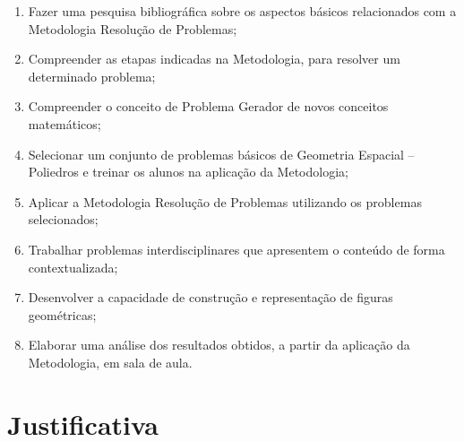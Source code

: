 \begin{enumerate}

    \item Fazer uma pesquisa bibliográfica sobre os aspectos básicos relacionados com a Metodologia Resolução de Problemas;
    \item Compreender as etapas indicadas na Metodologia, para resolver um determinado problema;
    \item Compreender o conceito de Problema Gerador de novos conceitos matemáticos;
    \item Selecionar um conjunto de problemas básicos de Geometria Espacial – Poliedros e treinar os alunos na aplicação da Metodologia;
    \item Aplicar a Metodologia Resolução de Problemas utilizando os problemas selecionados;
    \item Trabalhar problemas interdisciplinares que apresentem o conteúdo de forma contextualizada;
    \item Desenvolver a capacidade de construção e representação de figuras geométricas;
    \item Elaborar uma análise dos resultados obtidos, a partir da aplicação da Metodologia, em sala de aula.

\end{enumerate}

\section{Justificativa}

